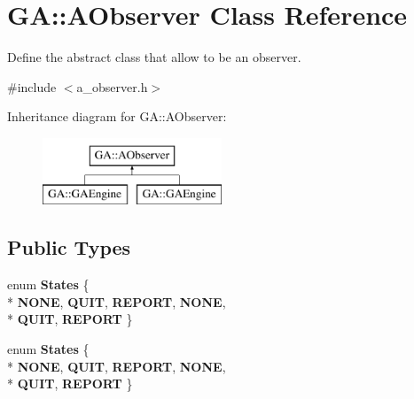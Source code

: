 \section{G\+A\+:\+:A\+Observer Class Reference}
\label{class_g_a_1_1_a_observer}


Define the abstract class that allow to be an observer.  




{\ttfamily \#include $<$a\+\_\+observer.\+h$>$}

Inheritance diagram for G\+A\+:\+:A\+Observer\+:\begin{figure}[H]
\begin{center}
\leavevmode
\includegraphics[height=2.000000cm]{class_g_a_1_1_a_observer}
\end{center}
\end{figure}
\subsection*{Public Types}
\begin{DoxyCompactItemize}
\item 
enum {\bfseries States} \{ \\*
{\bfseries N\+O\+N\+E}, 
{\bfseries Q\+U\+I\+T}, 
{\bfseries R\+E\+P\+O\+R\+T}, 
{\bfseries N\+O\+N\+E}, 
\\*
{\bfseries Q\+U\+I\+T}, 
{\bfseries R\+E\+P\+O\+R\+T}
 \}\label{class_g_a_1_1_a_observer_a1c7c36e301acb5574a7b1d43dbeefb7a}

\item 
enum {\bfseries States} \{ \\*
{\bfseries N\+O\+N\+E}, 
{\bfseries Q\+U\+I\+T}, 
{\bfseries R\+E\+P\+O\+R\+T}, 
{\bfseries N\+O\+N\+E}, 
\\*
{\bfseries Q\+U\+I\+T}, 
{\bfseries R\+E\+P\+O\+R\+T}
 \}\label{class_g_a_1_1_a_observer_a1c7c36e301acb5574a7b1d43dbeefb7a}

\end{DoxyCompactItemize}
